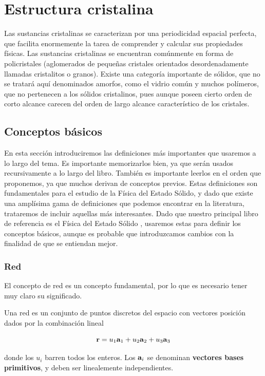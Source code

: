 \chapter{Estructura cristalina} \label{Ch:01}

Las sustancias cristalinas se caracterizan por una periodicidad espacial perfecta, que facilita enormemente la tarea de comprender y calcular sus propiedades físicas. Las sustancias cristalinas se encuentran comúnmente en forma de policristales (aglomerados de pequeñas cristales orientados desordenadamente llamadas cristalitos o granos). Existe una categoría importante de sólidos, que no se tratará aquí denominados amorfos, como el vidrio común  y muchos polímeros, que no pertenecen a los sólidos cristalinos, pues aunque poseen cierto orden de corto alcance carecen del orden de largo alcance característico de los cristales.

\section{Conceptos básicos}

En esta sección introduciremos las definiciones más importantes que usaremos a lo largo del tema. Es importante memorizarlos bien, ya que serán usados recursivamente a lo largo del libro. También es importante leerlos en el orden que proponemos, ya que muchos derivan de conceptos previos. Estas definiciones son fundamentales para el estudio de la Física del Estado Sólido, y dado que existe una amplísima gama de definiciones que podemos encontrar en la literatura, trataremos de incluir aquellas más interesantes. Dado que nuestro principal libro de referencia es el Física del Estado Sólido \cite{Fisica_del_Estado_Solido}, usaremos estas para definir los conceptos básicos, aunque es probable que introduzcamos cambios con la finalidad de que se entiendan mejor.


\subsection{Red}

El concepto de red es un concepto fundamental, por lo que es necesario tener muy claro su significado. 

\begin{definition}
	Una red es un conjunto de puntos discretos del espacio con vectores posición dados por la combinación lineal
	
	\begin{equation}
	\mathbf{r} = u_1 \mathbf{a}_1 + u_2 \mathbf{a}_2 + u_3 \mathbf{a}_3 \label{Ec:01-01-01} 
	\end{equation}

	donde los $u_i$ barren todos los enteros. Los $\mathbf{a}_i$ se denominan \textbf{vectores bases primitivos}, y deben ser linealemente independientes.\label{Def:01-01}
\end{definition}

